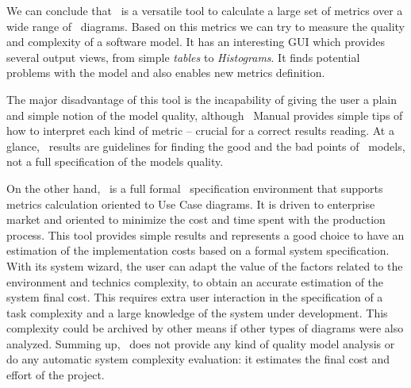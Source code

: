 We can conclude that \sdmetrics\ is a versatile tool to calculate a large set of metrics over a wide range of \uml\ diagrams. Based on this metrics we can try to measure the quality and complexity of a software model.
It has an interesting GUI which provides several output views, from simple \emph{tables} to \emph{Histograms}. It finds potential problems with the model and also enables new metrics definition.

The major disadvantage of this tool is the incapability of giving the user a plain and simple notion of the model quality, although \sdmetrics\ Manual provides simple tips of how to interpret each kind of metric -- crucial for a correct results reading.
At a glance, \sdmetrics\ results are guidelines for finding the good and the bad points of  \uml\ models, not a full specification of the models quality. 

On the other hand, \entArch\ is a full formal \uml\ specification environment that supports metrics calculation oriented to Use Case diagrams. 
It is driven to enterprise market and oriented to minimize the cost and time spent with the production process.
This tool provides simple results and represents a good choice to have an estimation of the
implementation costs based on a formal system specification.
With its system wizard, the user can adapt the value of the factors related to the environment and technics complexity, to obtain an accurate estimation of the system final cost.
This requires extra user interaction in the specification of a task complexity and a large knowledge of the system under development.
This complexity could be archived by other means if other types of diagrams were also analyzed.
Summing up, \entArch\ does not provide any kind of quality model analysis or do any automatic system complexity evaluation: it estimates the final cost and effort of the project.

\begin{comment}
We consider this a valid approach, but it requires some extra user interaction in the specification of the complexity of a task.
This complexity could be archived by other means if other types of diagrams were also analyzed.
The final results presented are simple and also oriented to the final cost, but if the complexity has been specified with knowledge of the environment, they could estimate very well the final cost of the implemented system.

Summing up, in metrics evaluation, this tool is a good choice to have an estimation of the implementation cost on a formally specified system, but this is its only goal, it cannot provide any kind of analysis about the quality of specification or do any automatic analysis about the system complexity.
\end{comment}

